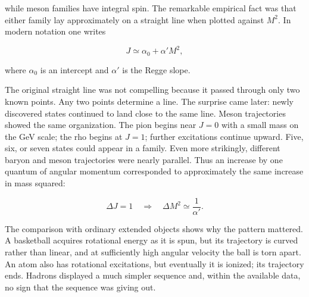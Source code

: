 while meson families have integral spin. The remarkable empirical fact was
that either family lay approximately on a straight line when plotted against
\(M^2\). In modern notation one writes

\begin{equation}
  J\simeq \alpha_0+\alpha' M^2,
  \label{eq:l01-regge-trajectory}
\end{equation}

where \(\alpha_0\) is an intercept and \(\alpha'\) is the Regge slope.

The original straight line was not compelling because it passed through only
two known points. Any two points determine a line. The surprise came later:
newly discovered states continued to land close to the same line. Meson
trajectories showed the same organization. The pion begins near \(J=0\) with
a small mass on the GeV scale; the rho begins at \(J=1\); further excitations
continue upward. Five, six, or seven states could appear in a family. Even
more strikingly, different baryon and meson trajectories were nearly
parallel. Thus an increase by one quantum of angular momentum corresponded
to approximately the same increase in mass squared:

\begin{equation}
  \Delta J=1
  \quad\Longrightarrow\quad
  \Delta M^2\simeq \frac{1}{\alpha'}.
  \label{eq:l01-regge-spacing}
\end{equation}

\begin{classroomqa}
\end{classroomqa}

The comparison with ordinary extended objects shows why the pattern mattered.
A basketball acquires rotational energy as it is spun, but its trajectory is
curved rather than linear, and at sufficiently high angular velocity the ball
is torn apart. An atom also has rotational excitations, but eventually it is
ionized; its trajectory ends. Hadrons displayed a much simpler sequence and,
within the available data, no sign that the sequence was giving out.

